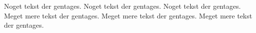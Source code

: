 \documentclass{article}
\begin{document}
Noget tekst der gentages. 
Noget tekst der gentages. 
Noget tekst der gentages. 
Meget mere tekst der gentages.
Meget mere tekst der gentages.
Meget mere tekst der gentages.


\listoftodos
\end{document}
